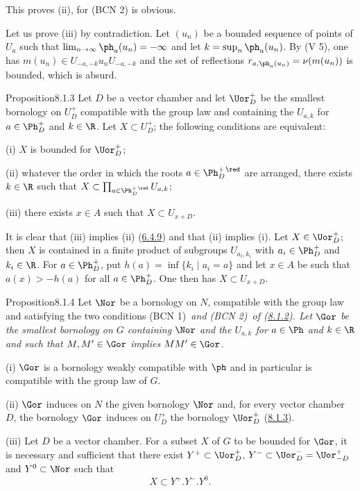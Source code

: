 \documentclass[12pt,a4paper,oneside,english]{smfart}
\makeatletter
\newcommand{\btanchor}[1]{\leavevmode\Hy@raisedlink{\hypertarget{bt:#1}{}}}
\newcommand{\btref}[1]{\hyperlink{bt:#1}{#1}}
\theoremstyle{definition}
\theoremstyle{bt}
\makeatother
\begin{document}
This proves (ii), for (BCN 2) is obvious.

Let us prove (iii) by contradiction. Let $(u_n)$ be a bounded sequence of points of
$U_a$ such that $\lim_{n\to\infty}\ph_a(u_n)=-\infty$ and let
$k=\sup_n\ph_a(u_n)$. By (V 5), one has $m(u_n)\in U_{-a,-k}u_nU_{-a,-k}$ and the set
of reflections $r_{a,\ph_a(u_n)}=\nu(m(u_n))$ is bounded, which is absurd.

\begin{stmt}{Proposition}{8.1.3}\btanchor{8.1.3}
Let $D$ be a vector chamber and let $\Uor^+_D$ be the smallest bornology on $U^+_D$
compatible with the group law and containing the $U_{a,k}$ for $a\in\Ph^+_D$ and
$k\in\R$. Let $X\subset U^+_D$; the following conditions are equivalent:

(i) $X$ is bounded for $\Uor^+_D$;

(ii) whatever the order in which the roots $a\in\Ph^{+\,\red}_D$ are arranged, there
exists $k\in\R$ such that
$X\subset\prod_{a\in\Ph^{+\,\red}_D}U_{a,k}$;

(iii) there exists $x\in A$ such that $X\subset U_{x+D}$.
\end{stmt}

It is clear that (iii) implies (ii) (\btref{6.4.9}) and that (ii) implies (i). Let
$X\in\Uor^+_D$; then $X$ is contained in a finite product of subgroups
$U_{a_i,k_i}$ with $a_i\in\Ph^+_D$ and $k_i\in\R$. For $a\in\Ph^+_D$, put
$h(a)=\inf\{k_i\mid a_i=a\}$ and let $x\in A$ be such that $a(x)>-h(a)$ for all
$a\in\Ph^+_D$. One then has $X\subset U_{x+D}$.

\begin{stmt}{Proposition}{8.1.4}\btanchor{8.1.4}
Let $\Nor$ be a bornology on $N$, compatible with the group law and satisfying the two
conditions \upshape(BCN 1)\itshape\ and \upshape(BCN 2)\itshape\ of (\btref{8.1.2}). Let $\Gor$
be the smallest bornology on $G$ containing $\Nor$ and the $U_{a,k}$ for $a\in\Ph$ and
$k\in\R$ and such that $M,M'\in\Gor$ implies $MM'\in\Gor$.

(i) $\Gor$ is a bornology weakly compatible with $\ph$ and in particular is compatible
with the group law of $G$.

(ii) $\Gor$ induces on $N$ the given bornology $\Nor$ and, for every vector chamber
$D$, the bornology $\Gor$ induces on $U^+_D$ the bornology $\Uor^+_D$ (\btref{8.1.3}).

(iii) Let $D$ be a vector chamber. For a subset $X$ of $G$ to be bounded for $\Gor$, it
is necessary and sufficient that there exist $Y^+\subset\Uor^+_D$,
$Y^-\subset\Uor^-_D=\Uor^+_{-D}$ and $Y^0\subset\Nor$ such that
\[
X\subset Y^+.Y^-.Y^0 .
\]
\end{stmt}
\end{document}
